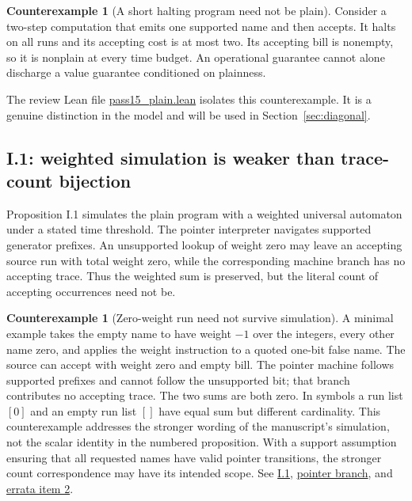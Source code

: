 \documentclass[11pt,letterpaper]{article}
\theoremstyle{definition}\newtheorem{definition}[theorem]{Definition}\newtheorem{example}[theorem]{Example}
\newtheorem{counterexample}[theorem]{Counterexample}
\theoremstyle{remark}\newtheorem{remark}[theorem]{Remark}
\newcommand{\pub}[3]{\href{https://github.com/anthropics/formal-math/blob/11b6c7e3c927df2658f513b6b68ea7f8929c62c5/vp-vnp/#1\#L#2}{#3}}
\newcommand{\aud}[2]{\href{https://github.com/nousentllc/VP-VNP-Review/blob/567303d0bcf4f9d54390437b137752446e58ccd6/#1}{#2}}
\begin{document}
\begin{counterexample}[A short halting program need not be plain]
Consider a two-step computation that emits one supported name and then accepts. It halts on all runs and its accepting cost is at most two. Its accepting bill is nonempty, so it is nonplain at every time budget. An operational guarantee cannot alone discharge a value guarantee conditioned on plainness.
\end{counterexample}
The review Lean file \aud{checks/pass15_plain.lean}{pass15\_plain.lean} isolates this counterexample. It is a genuine distinction in the model and will be used in Section~\ref{sec:diagonal}.

\subsection{I.1: weighted simulation is weaker than trace-count bijection}\label{sec:i1}
Proposition I.1 simulates the plain program with a weighted universal automaton under a stated time threshold. The pointer interpreter navigates supported generator prefixes. An unsupported lookup of weight zero may leave an accepting source run with total weight zero, while the corresponding machine branch has no accepting trace. Thus the weighted sum is preserved, but the literal count of accepting occurrences need not be.

\begin{counterexample}[Zero-weight run need not survive simulation]\label{ex:i1}
A minimal example takes the empty name to have weight $-1$ over the integers, every other name zero, and applies the weight instruction to a quoted one-bit false name. The source can accept with weight zero and empty bill. The pointer machine follows supported prefixes and cannot follow the unsupported bit; that branch contributes no accepting trace. The two sums are both zero. In symbols a run list $[0]$ and an empty run list $[]$ have equal sum but different cardinality. This counterexample addresses the stronger wording of the manuscript's simulation, not the scalar identity in the numbered proposition. With a support assumption ensuring that all requested names have valid pointer transitions, the stronger count correspondence may have its intended scope. See \pub{Paper/Universal.lean}{29}{I.1}, \pub{Nc/Uni/EvalU.lean}{251}{pointer branch}, and \aud{passes/publisher-errata.md}{errata item 2}.
\end{counterexample}
\end{document}
